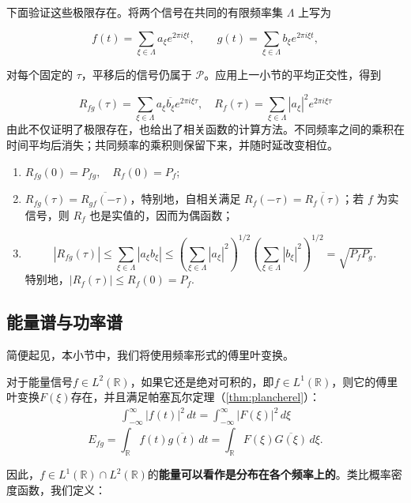 下面验证这些极限存在。将两个信号在共同的有限频率集 $\Lambda$ 上写为

$$
    f(t)=\sum_{\xi\in\Lambda}a_\xi e^{2\pi i\xi t},
    \qquad
    g(t)=\sum_{\xi\in\Lambda}b_\xi e^{2\pi i\xi t},
$$

对每个固定的 $\tau$，平移后的信号仍属于 $\mathcal{P}$。应用上一小节的平均正交性，得到

$$
    R_{fg}(\tau)=\sum_{\xi\in\Lambda}
    a_\xi\overline{b_\xi}e^{2\pi i\xi\tau},\quad
    R_f(\tau)=\sum_{\xi\in\Lambda}|a_\xi|^2e^{2\pi i\xi\tau}
$$
由此不仅证明了极限存在，也给出了相关函数的计算方法。不同频率之间的乘积在时间平均后消失；共同频率的乘积则保留下来，并随时延改变相位。

\begin{proposition}[功率信号的相关函数的性质]
    \quad
    \begin{enumerate}
        \item $R_{fg}(0)=P_{fg},\quad R_f(0)=P_f$;
        \item $R_{fg}(\tau)=\overline{R_{gf}(-\tau)}$，特别地，自相关满足 $R_f(-\tau)=\overline{R_f(\tau)}$；若 $f$ 为实信号，则 $R_f$ 也是实值的，因而为偶函数；
        \item $$
                  |R_{fg}(\tau)|
                  \le\sum_{\xi\in\Lambda}|a_\xi b_\xi|
                  \le
                  \left(\sum_{\xi\in\Lambda}|a_\xi|^2\right)^{1/2}
                  \left(\sum_{\xi\in\Lambda}|b_\xi|^2\right)^{1/2}
                  =\sqrt{P_fP_g}.
              $$
              特别地，$|R_f(\tau)|\le R_f(0)=P_f$.
    \end{enumerate}
\end{proposition}

\subsection{能量谱与功率谱}\label{sub:power_spectrum}

简便起见，本小节中，我们将使用频率形式的傅里叶变换。

对于能量信号$f\in L^2(\mathbb{R})$，如果它还是绝对可积的，即$f\in L^1(\mathbb{R})$，则它的傅里叶变换$F(\xi)$存在，并且满足帕塞瓦尔定理（\cref{thm:plancherel}）：
\begin{align*}
    \int_{-\infty}^{\infty}|f(t)|^2\,dt=\int_{-\infty}^{\infty}|F(\xi)|^2\,d\xi
\end{align*}
$$
    E_{fg}=\int_{\mathbb R}f(t)\overline{g(t)}\,dt
    =\int_{\mathbb R}F(\xi)\overline{G(\xi)}\,d\xi.
$$

因此，$f\in L^1(\mathbb{R})\cap L^2(\mathbb{R})$的\textbf{能量可以看作是分布在各个频率上的}。类比概率密度函数，我们定义：

